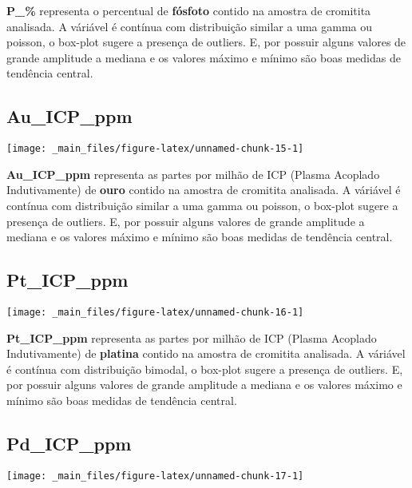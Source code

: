 \documentclass[
]{article}
\begin{document}
\textbf{P\_\%} representa o percentual de \textbf{fósfoto} contido na amostra de cromitita analisada. A váriável é contínua com distribuição similar a uma gamma ou poisson, o box-plot sugere a presença de outliers. E, por possuir alguns valores de grande amplitude a mediana e os valores máximo e mínimo são boas medidas de tendência central.

\hypertarget{au_icp_ppm}{%
\subsection{Au\_ICP\_ppm}\label{au_icp_ppm}}

\begin{center}\texttt{[image: \_main\_files/figure-latex/unnamed-chunk-15-1]} \end{center}

\textbf{Au\_ICP\_ppm} representa as partes por milhão de ICP (Plasma Acoplado Indutivamente) de \textbf{ouro} contido na amostra de cromitita analisada. A váriável é contínua com distribuição similar a uma gamma ou poisson, o box-plot sugere a presença de outliers. E, por possuir alguns valores de grande amplitude a mediana e os valores máximo e mínimo são boas medidas de tendência central.

\hypertarget{pt_icp_ppm}{%
\subsection{Pt\_ICP\_ppm}\label{pt_icp_ppm}}

\begin{center}\texttt{[image: \_main\_files/figure-latex/unnamed-chunk-16-1]} \end{center}

\textbf{Pt\_ICP\_ppm} representa as partes por milhão de ICP (Plasma Acoplado Indutivamente) de \textbf{platina} contido na amostra de cromitita analisada. A váriável é contínua com distribuição bimodal, o box-plot sugere a presença de outliers. E, por possuir alguns valores de grande amplitude a mediana e os valores máximo e mínimo são boas medidas de tendência central.

\hypertarget{pd_icp_ppm}{%
\subsection{Pd\_ICP\_ppm}\label{pd_icp_ppm}}

\begin{center}\texttt{[image: \_main\_files/figure-latex/unnamed-chunk-17-1]} \end{center}
\end{document}
